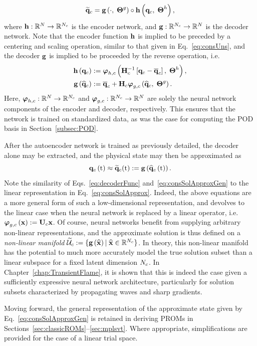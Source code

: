 %
\begin{equation}
    \mathbf{\widetilde{q}}_{c} = \mathbf{g} \left(\cdot, \; \boldsymbol{\Theta}^{g}\right) \circ \mathbf{h} \left(\mathbf{q}_{c}, \; \boldsymbol{\Theta}^{h}\right),
\end{equation}
%
where $\mathbf{h}: \mathbb{R}^{N} \rightarrow \mathbb{R}^{N_c}$ is the encoder network, and $\mathbf{g}: \mathbb{R}^{N_c} \rightarrow \mathbb{R}^{N}$ is the decoder network. Note that the encoder function $\mathbf{h}$ is implied to be preceded by a centering and scaling operation, similar to that given in Eq.~\ref{eq:consUns}, and the decoder $\mathbf{g}$ is implied to be proceeded by the reverse operation, i.e.
%
\begin{align}
    \encoderFunc{\consVec} &\defEq \nnLayer_{\encoderVar,\consVar} \left(\consScaleInv\left[\consVec - \consVecCent\right], \; \nnParams^{\encoderVar}\right), \\
    \decoderFunc{\consVecCoef} &\defEq \consVecCent + \consScale \trialConsFunc{\consVecCoef, \; \nnParams^{\decoderVar}}. \label{eq:decoderFunc}
\end{align}
%
Here, $\boldsymbol{\varphi}_{h,c}: \mathbb{R}^{N} \rightarrow \mathbb{R}^{N_c}$ and $\boldsymbol{\varphi}_{g, c}: \mathbb{R}^{N_c} \rightarrow \mathbb{R}^{N}$ are solely the neural network components of the encoder and decoder, respectively. This ensures that the network is trained on standardized data, as was the case for computing the POD basis in Section~\ref{subsec:POD}.

After the autoencoder network is trained as previously detailed, the decoder alone may be extracted, and the physical state may then be approximated as
%
\begin{equation}\label{eq:consSolApproxGen}
    \mathbf{q}_{c}\left(\text{t}\right) \approx \mathbf{\widetilde{q}}_{c}(\text{t}) := \mathbf{g} \left(\mathbf{\widehat{q}}_{c}\left(\text{t}\right)\right).
\end{equation}
%
Note the similarity of Eqs.~\ref{eq:decoderFunc} and~\ref{eq:consSolApproxGen} to the linear representation in Eq.~\ref{eq:consSolApprox}. Indeed, the above equations are a more general form of such a low-dimensional representation, and devolves to the linear case when the neural network is replaced by a linear operator, i.e. $\trialConsFunc{\nnInput} \defEq \consTrial \nnInput$. Of course, neural networks benefit from supplying arbitrary non-linear representations, and the approximate solution is thus defined on a \textit{non-linear manifold} $\consTrialSpace \defEq \{\decoderFunc{\nnInputCoef} \vert \; \nnInputCoef \inROne{\numConsModes} \}$. In theory, this non-linear manifold has the potential to much more accurately model the true solution subset than a linear subspace for a fixed latent dimension $N_c$. In Chapter~\ref{chap:TransientFlame}, it is shown that this is indeed the case given a sufficiently expressive neural network architecture, particularly for solution subsets characterized by propagating waves and sharp gradients.

Moving forward, the general representation of the approximate state given by Eq.~\ref{eq:consSolApproxGen} is retained in deriving PROMs in Sections~\ref{sec:classicROMs}--\ref{sec:mplsvt}. Where appropriate, simplifications are provided for the case of a linear trial space.
